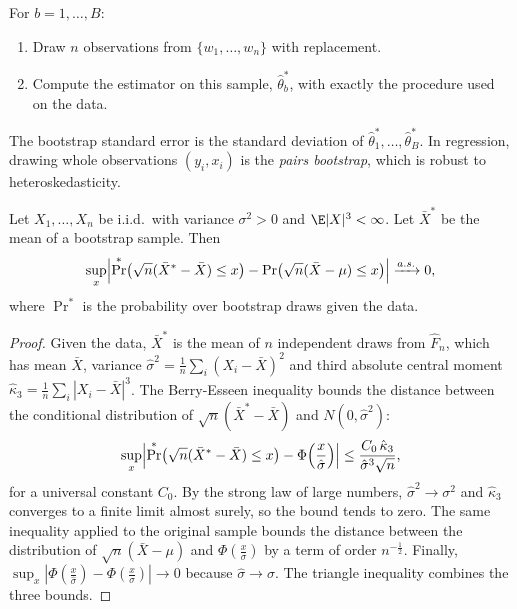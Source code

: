 \begin{remark}\label{rem:A-pairs-boot}
For $b = 1, \dots, B$:
\begin{enumerate}[label=(\arabic*)]
  \item Draw $n$ observations from $\{w_1, \dots, w_n\}$ with replacement.
  \item Compute the estimator on this sample, $\hat\theta^*_b$, with exactly the procedure used on the data.
\end{enumerate}
The bootstrap standard error is the standard deviation of $\hat\theta^*_1, \dots, \hat\theta^*_B$. In regression,
drawing whole observations $(y_i, x_i)$ is the \emph{pairs bootstrap}, which is robust to heteroskedasticity.
\end{remark}

\begin{proposition}\label{prop:A-boot-mean}
Let $X_1, \dots, X_n$ be i.i.d.\ with variance $\sigma^2 > 0$ and $\E|X|^3 < \infty$. Let $\bar X^*$ be the mean of a
bootstrap sample. Then
\begin{equation*}
  \sup_x\Bigl|\Pr^*\bigl(\sqrt n(\bar X^* - \bar X) \le x\bigr) - \Pr\bigl(\sqrt n(\bar X - \mu) \le x\bigr)\Bigr|
  \xrightarrow{a.s.} 0,
\end{equation*}
where $\Pr^*$ is the probability over bootstrap draws given the data.
\end{proposition}

\begin{proof}
Given the data, $\bar X^*$ is the mean of $n$ independent draws from $\hat F_n$, which has mean $\bar X$, variance
$\hat\sigma^2 = \frac{1}{n}\sum_i(X_i - \bar X)^2$ and third absolute central moment $\hat\kappa_3 =
\frac{1}{n}\sum_i|X_i - \bar X|^3$. The Berry-Esseen inequality bounds the distance between the conditional
distribution of $\sqrt n(\bar X^* - \bar X)$ and $N(0, \hat\sigma^2)$:
\begin{equation*}
  \sup_x\Bigl|\Pr^*\bigl(\sqrt n(\bar X^* - \bar X) \le x\bigr) - \Phi\Bigl(\frac{x}{\hat\sigma}\Bigr)\Bigr|
  \le \frac{C_0\,\hat\kappa_3}{\hat\sigma^3\sqrt n},
\end{equation*}
for a universal constant $C_0$. By the strong law of large numbers, $\hat\sigma^2 \to \sigma^2$ and $\hat\kappa_3$
converges to a finite limit almost surely, so the bound tends to zero. The same inequality applied to the original
sample bounds the distance between the distribution of $\sqrt n(\bar X - \mu)$ and $\Phi(\frac{x}{\sigma})$ by a
term of order $n^{-\frac{1}{2}}$. Finally, $\sup_x|\Phi(\frac{x}{\hat\sigma}) - \Phi(\frac{x}{\sigma})| \to 0$ because
$\hat\sigma \to \sigma$. The triangle inequality combines the three bounds.
\end{proof}

